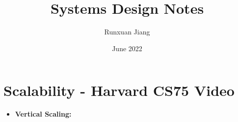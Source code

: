 \documentclass[11pt]{article}
\title{Systems Design Notes}
\author{Runxuan Jiang}
\date{June 2022}
\begin{document}
    \maketitle

    \section{Scalability - Harvard CS75 Video}

    \begin{itemize}
        \item \textbf{Vertical Scaling:} 
        
    \end{itemize}
\end{document}
